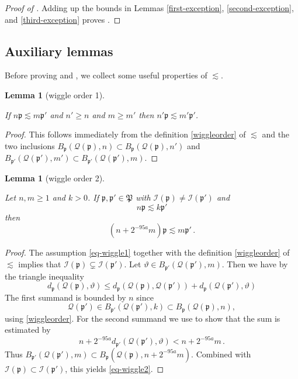 \documentclass[10pt,a4paper]{article}
\theoremstyle{plain}
\newtheorem{lemma}[theorem]{Lemma}
\theoremstyle{definition}
\numberwithin{equation}{subsection}
\newcommand{\fp}{{\mathfrak p}}
\newcommand{\fP}{{\mathfrak P}}
\newcommand{\scI}{{\mathcal{I}}} %
\newcommand{\mfa}{{\vartheta}}
\newcommand{\fcc}{{\mathcal{Q}}}
\newcommand{\lean}[1]{}
\newcommand{\proves}[1]{}
\newcommand{\uses}[1]{}
\newcommand{\leanok}{}
\begin{document}
\begin{proof}[Proof of ]
    \leanok
    \proves{exceptional-set}
Adding up the bounds in Lemmas \ref{first-exception}, \ref{second-exception}, and \ref{third-exception} proves .
\end{proof}


\subsection{Auxiliary lemmas}
\label{subsec-lessim-aux}
Before proving  and , we collect some useful properties of $\lesssim$.

\begin{lemma}[wiggle order 1]
    \label{wiggle-order-1}
    \leanok
    \lean{smul_mono}
    If $n\fp \lesssim m\fp'$ and
    $n' \ge n$ and $m \ge m'$ then $n'\fp \lesssim m'\fp'$.
\end{lemma}

\begin{proof}
    \leanok
    This follows immediately from the definition \eqref{wiggleorder} of $\lesssim$ and the two inclusions $B_{\fp}(\fcc(\fp), n) \subset B_{\fp}(\fcc(\fp), n')$ and $B_{\fp'}(\fcc(\fp'), m') \subset B_{\fp'}(\fcc(\fp'), m)$.
\end{proof}

\begin{lemma}[wiggle order 2]
    \label{wiggle-order-2}
    \leanok
    \lean{smul_C2_1_2}
    \uses{monotone-cube-metrics}

    Let $n, m \ge 1$ and $k > 0$.
    If $\fp, \fp' \in \fP$ with $\scI(\fp) \ne \scI(\fp')$ and
    \begin{equation}
        \label{eq-wiggle1}
        n \fp \lesssim k \fp'
    \end{equation}
    then
    \begin{equation}
        \label{eq-wiggle2}
        (n + 2^{-95 a} m) \fp \lesssim m\fp'\,.
    \end{equation}
\end{lemma}

\begin{proof}
    \leanok
    The assumption \eqref{eq-wiggle1} together with the definition \eqref{wiggleorder} of $\lesssim$ implies that $\scI(\fp) \subsetneq \scI(\fp')$. Let $\mfa \in B_{\fp'}(\fcc(\fp'), m)$. Then we have by the triangle inequality
    $$
        d_{\fp}(\fcc(\fp), \mfa) \le d_{\fp}(\fcc(\fp), \fcc(\fp')) + d_{\fp}(\fcc(\fp'), \mfa)
    $$
    The first summand is bounded by $n$ since
    $$
        \fcc(\fp') \in B_{\fp'}(\fcc(\fp'), k) \subset B_{\fp}(\fcc(\fp), n),
    $$
    using \eqref{wiggleorder}. For the second summand we use 
    to show that the sum is estimated by
    $$
        n + 2^{-95a} d_{\fp'}(\fcc(\fp'), \mfa) < n + 2^{-95a} m\,.
    $$
    Thus $B_{\fp'}(\fcc(\fp'),m) \subset B_{\fp}(\fcc(\fp),n + 2^{-95a}m)$. Combined with $\scI(\fp) \subset \scI(\fp')$, this yields \eqref{eq-wiggle2}.
\end{proof}
\end{document}
